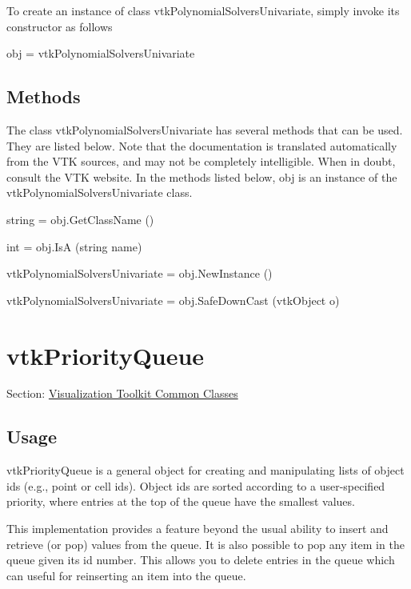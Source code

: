 To create an instance of class vtk\-Polynomial\-Solvers\-Univariate, simply invoke its constructor as follows \begin{DoxyVerb}  obj = vtkPolynomialSolversUnivariate
\end{DoxyVerb}
 \hypertarget{vtkwidgets_vtkxyplotwidget_Methods}{}\subsection{Methods}\label{vtkwidgets_vtkxyplotwidget_Methods}
The class vtk\-Polynomial\-Solvers\-Univariate has several methods that can be used. They are listed below. Note that the documentation is translated automatically from the V\-T\-K sources, and may not be completely intelligible. When in doubt, consult the V\-T\-K website. In the methods listed below, {\ttfamily obj} is an instance of the vtk\-Polynomial\-Solvers\-Univariate class. 
\begin{DoxyItemize}
\item {\ttfamily string = obj.\-Get\-Class\-Name ()}  
\item {\ttfamily int = obj.\-Is\-A (string name)}  
\item {\ttfamily vtk\-Polynomial\-Solvers\-Univariate = obj.\-New\-Instance ()}  
\item {\ttfamily vtk\-Polynomial\-Solvers\-Univariate = obj.\-Safe\-Down\-Cast (vtk\-Object o)}  
\end{DoxyItemize}\hypertarget{vtkcommon_vtkpriorityqueue}{}\section{vtk\-Priority\-Queue}\label{vtkcommon_vtkpriorityqueue}
Section\-: \hyperlink{sec_vtkcommon}{Visualization Toolkit Common Classes} \hypertarget{vtkwidgets_vtkxyplotwidget_Usage}{}\subsection{Usage}\label{vtkwidgets_vtkxyplotwidget_Usage}
vtk\-Priority\-Queue is a general object for creating and manipulating lists of object ids (e.\-g., point or cell ids). Object ids are sorted according to a user-\/specified priority, where entries at the top of the queue have the smallest values.

This implementation provides a feature beyond the usual ability to insert and retrieve (or pop) values from the queue. It is also possible to pop any item in the queue given its id number. This allows you to delete entries in the queue which can useful for reinserting an item into the queue.

